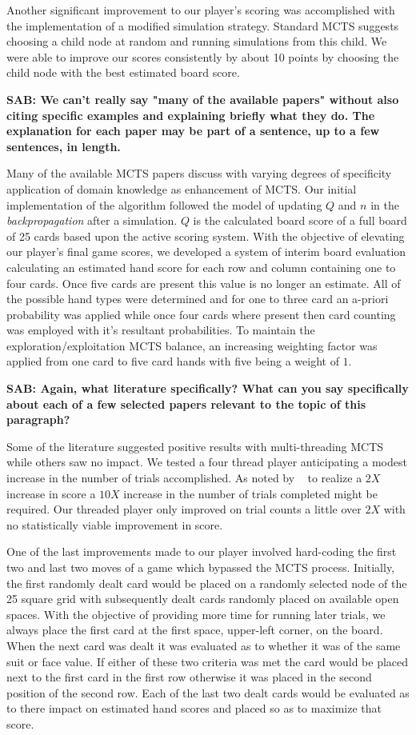 \documentclass[letterpaper]{article}
\begin{document}
Another significant improvement to our player's scoring was accomplished with the implementation of a modified simulation strategy. Standard MCTS suggests choosing a child node at random and running simulations from this child. We were able to improve our scores consistently by about 10 points by choosing the child node with the best estimated board score.

{\bf SAB: We can't really say "many of the available papers" without also citing specific examples and explaining briefly what they do. The explanation for each paper may be part of a sentence, up to a few sentences, in length.}

Many of the available MCTS papers discuss with varying degrees of specificity application of domain knowledge as enhancement of MCTS. Our initial implementation of the algorithm followed the model of updating $Q$ and $n$ in the \emph{backpropagation} after a simulation. $Q$ is the calculated board score of a full board of 25 cards based upon the active scoring system. With the objective of elevating our player's final game scores, we developed a system of interim board evaluation calculating an estimated hand score for each row and column containing one to four cards. Once five cards are present this value is no longer an estimate. All of the possible hand types were determined and for one to three card an a-priori probability was applied while once four cards where present then card counting was employed with it's resultant probabilities. To maintain the exploration/exploitation MCTS balance, an increasing weighting factor was applied from one card to five card hands with five being a weight of $1$.

{\bf SAB: Again, what literature specifically? What can you say specifically about each of a few selected papers relevant to the topic of this paragraph?}

Some of the literature suggested positive results with multi-threading MCTS while others saw no impact. We tested a four thread player anticipating a modest increase in the number of trials accomplished. As noted by ~\cite{browne2010monte} to realize a $2X$ increase in score a $10X$ increase in the number of trials completed might be required. Our threaded player only improved on trial counts a little over $2X$ with no statistically viable improvement in score.

One of the last improvements made to our player involved hard-coding the first two and last two moves of a game which bypassed the MCTS process. Initially, the first randomly dealt card would be placed on a randomly selected node of the 25 square grid with subsequently dealt cards randomly placed on available open spaces. With the objective of providing more time for running later trials, we always place the first card at the first space, upper-left corner, on the board. When the next card was dealt it was evaluated as to whether it was of the same suit or face value. If either of these two criteria was met the card would be placed next to the first card in the first row otherwise it was placed in the second position of the second row. Each of the last two dealt cards would be evaluated as to there impact on estimated hand scores and placed so as to maximize that score.
\end{document}
